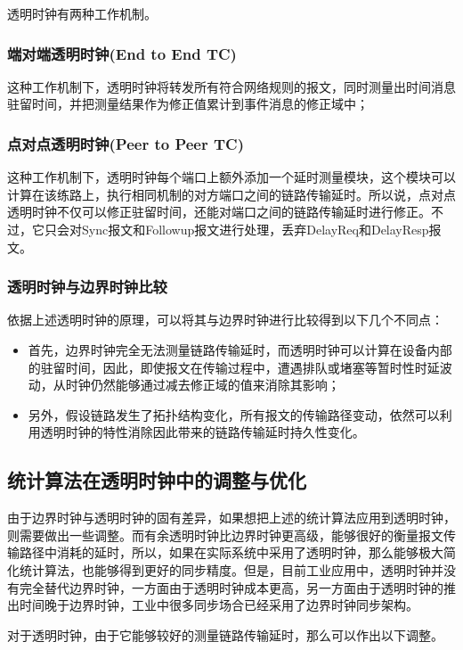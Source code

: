 透明时钟有两种工作机制。

\subsubsection{端对端透明时钟(End to End TC)}
这种工作机制下，透明时钟将转发所有符合网络规则的报文，同时测量出时间消息驻留时间，并把测量结果作为修正值累计到事件消息的修正域中；

\subsubsection{点对点透明时钟(Peer to Peer TC)}
这种工作机制下，透明时钟每个端口上额外添加一个延时测量模块，这个模块可以计算在该练路上，执行相同机制的对方端口之间的链路传输延时。所以说，点对点透明时钟不仅可以修正驻留时间，还能对端口之间的链路传输延时进行修正。不过，它只会对Sync报文和Followup报文进行处理，丢弃DelayReq和DelayResp报文。

\subsubsection{透明时钟与边界时钟比较}
依据上述透明时钟的原理，可以将其与边界时钟进行比较得到以下几个不同点：
\begin{itemize}[noitemsep,topsep=0pt,parsep=0pt,partopsep=0pt]
  \item 首先，边界时钟完全无法测量链路传输延时，而透明时钟可以计算在设备内部的驻留时间，因此，即使报文在传输过程中，遭遇排队或堵塞等暂时性时延波动，从时钟仍然能够通过减去修正域的值来消除其影响；
  \item 另外，假设链路发生了拓扑结构变化，所有报文的传输路径变动，依然可以利用透明时钟的特性消除因此带来的链路传输延时持久性变化。
\end{itemize}

\subsection{统计算法在透明时钟中的调整与优化}
由于边界时钟与透明时钟的固有差异，如果想把上述的统计算法应用到透明时钟，则需要做出一些调整。而有余透明时钟比边界时钟更高级，能够很好的衡量报文传输路径中消耗的延时，所以，如果在实际系统中采用了透明时钟，那么能够极大简化统计算法，也能够得到更好的同步精度。但是，目前工业应用中，透明时钟并没有完全替代边界时钟，一方面由于透明时钟成本更高，另一方面由于透明时钟的推出时间晚于边界时钟，工业中很多同步场合已经采用了边界时钟同步架构。

对于透明时钟，由于它能够较好的测量链路传输延时，那么可以作出以下调整。
